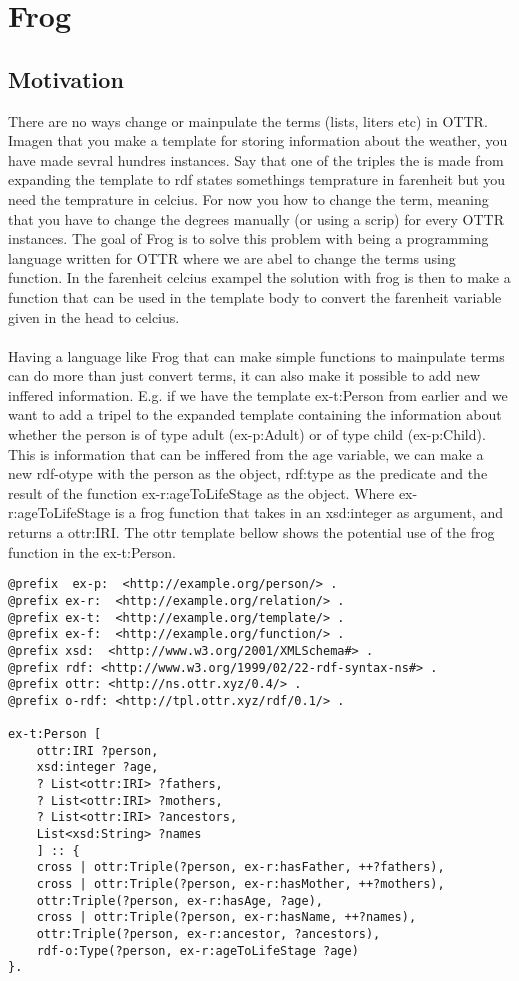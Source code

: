 \section{Frog}

\subsection{Motivation}
There are no ways change or mainpulate the terms (lists, liters etc) in OTTR. Imagen that you 
make a template for storing information about the weather, you have made sevral hundres instances. Say that one of the 
triples the is made from expanding the template to rdf states somethings temprature in farenheit but you need the temprature in celcius.
For now you how to change the term, meaning that you have to change the degrees manually (or using a scrip) for every OTTR instances.
The goal of Frog is to solve this problem with being a programming language written for OTTR where we are abel to change 
the terms using function. In the farenheit celcius exampel the solution with frog is then to make a function that can be used 
in the template body to convert the farenheit variable given in the head to celcius. 
\\ \\
Having a language like Frog that can make simple functions to mainpulate terms can do more than just convert terms, it can 
also make it possible to add new inffered information. E.g. if we have the template ex-t:Person from earlier
and we want to add a tripel to the expanded template containing the information about whether the person is of type adult (ex-p:Adult) or of type child (ex-p:Child). This 
is information that can be inffered from the age variable, we can make a new rdf-otype with the person as the object, rdf:type as the 
predicate and the result of the function ex-r:ageToLifeStage as the object. Where ex-r:ageToLifeStage is a frog function that takes in an xsd:integer
as argument, and returns a ottr:IRI. The ottr template bellow shows the potential use of the frog function in 
the ex-t:Person.

\begin{lstlisting}[frame=single]
@prefix  ex-p:  <http://example.org/person/> . 
@prefix ex-r:  <http://example.org/relation/> .
@prefix ex-t:  <http://example.org/template/> . 
@prefix ex-f:  <http://example.org/function/> .
@prefix xsd:  <http://www.w3.org/2001/XMLSchema#> . 
@prefix rdf: <http://www.w3.org/1999/02/22-rdf-syntax-ns#> .
@prefix ottr: <http://ns.ottr.xyz/0.4/> .
@prefix o-rdf: <http://tpl.ottr.xyz/rdf/0.1/> .

ex-t:Person [
    ottr:IRI ?person,
    xsd:integer ?age,
    ? List<ottr:IRI> ?fathers,
    ? List<ottr:IRI> ?mothers,
    ? List<ottr:IRI> ?ancestors,
    List<xsd:String> ?names
    ] :: {
    cross | ottr:Triple(?person, ex-r:hasFather, ++?fathers),
    cross | ottr:Triple(?person, ex-r:hasMother, ++?mothers),
    ottr:Triple(?person, ex-r:hasAge, ?age),
    cross | ottr:Triple(?person, ex-r:hasName, ++?names),
    ottr:Triple(?person, ex-r:ancestor, ?ancestors),
    rdf-o:Type(?person, ex-r:ageToLifeStage ?age)
}.
\end{lstlisting}

